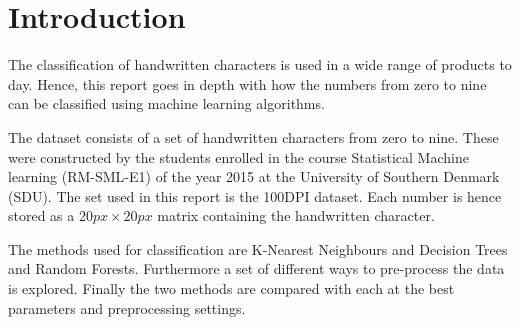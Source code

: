 \section{Introduction}
The classification of handwritten characters is used in a wide range of products to day.
Hence, this report goes in depth with how the numbers from zero to nine can be classified using machine learning algorithms.

The dataset consists of a set of handwritten characters from zero to nine.
These were constructed by the students enrolled in the course Statistical Machine learning (RM-SML-E1) of the year 2015 at the University of Southern Denmark (SDU).
The set used in this report is the 100DPI dataset.
Each number is hence stored as a $20px \times 20px$ matrix containing the handwritten character.

The methods used for classification are K-Nearest Neighbours and Decision Trees and Random Forests.
Furthermore a set of different ways to pre-process the data is explored.
Finally the two methods are compared with each at the best parameters and preprocessing settings.



